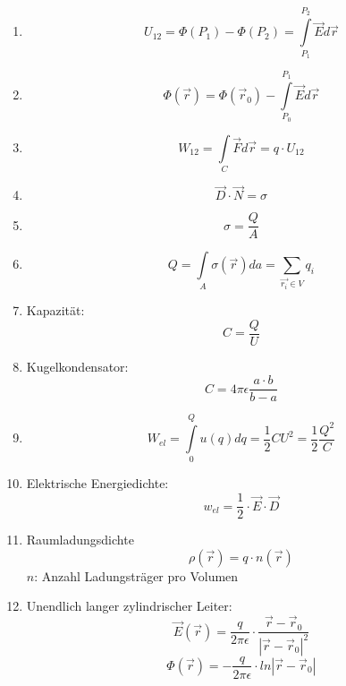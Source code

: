 \documentclass[a4paper,twocolumn,10pt]{article}
\begin{document}
\begin{enumerate}[label=$\bullet$]
\item
\begin{equation*}
U_{12}=\Phi(P_1)-\Phi(P_2)=\int\limits_{P_1}^{P_2}\overrightarrow{E}d\overrightarrow{r}
\end{equation*}
\item
\begin{equation*}
\Phi(\overrightarrow{r})=\Phi(\overrightarrow{r}_0)-\int\limits_{P_0}^{P_1}\overrightarrow{E}d \overrightarrow{r}
\end{equation*}
\item
\begin{equation*}
W_{12}=\int\limits_{C}\overrightarrow{F}d\overrightarrow{r}=q\cdot U_{12}
\end{equation*}
\item
\begin{equation*}
\overrightarrow{D}\cdot\overrightarrow{N}=\sigma
\end{equation*}
\item
\begin{equation*}
\sigma =\frac{Q}{A}
\end{equation*}
\item
\begin{equation*}
 Q=\int\limits_{A}\sigma(\overrightarrow{r})da=\sum\limits_{\overrightarrow{r_i}\in V}q_i
\end{equation*}
\item Kapazität:
\begin{equation*}
C=\frac{Q}{U}
\end{equation*}
\item Kugelkondensator:
\begin{equation*}
C=4\pi\epsilon\frac{a\cdot b}{b-a}
\end{equation*}
\item
\begin{equation*}
W_{el}=\int\limits_{0}^{Q}u(q)dq=\frac{1}{2}CU^2=\frac{1}{2}\frac{Q^2}{C}
\end{equation*}
\item Elektrische Energiedichte:
\begin{equation*}
w_{el}=\frac{1}{2}\cdot\overrightarrow{E}\cdot\overrightarrow{D}
\end{equation*}
\item Raumladungsdichte
\begin{equation*}
\rho(\overrightarrow{r})=q\cdot n(\overrightarrow{r})
\end{equation*}
$n$: Anzahl Ladungsträger pro Volumen
\item Unendlich langer zylindrischer Leiter:
\begin{equation*}
\overrightarrow{E}(\overrightarrow{r})=\frac{q}{2\pi\epsilon}\cdot\frac{\overrightarrow{r}-\overrightarrow{r}_0}{|\overrightarrow{r}-\overrightarrow{r}_0|^2}
\end{equation*}
\begin{equation*}
\Phi(\overrightarrow{r})=-\frac{q}{2\pi\epsilon}\cdot ln|\overrightarrow{r}-\overrightarrow{r}_0|
\end{equation*}
\end{enumerate}
\end{document}
